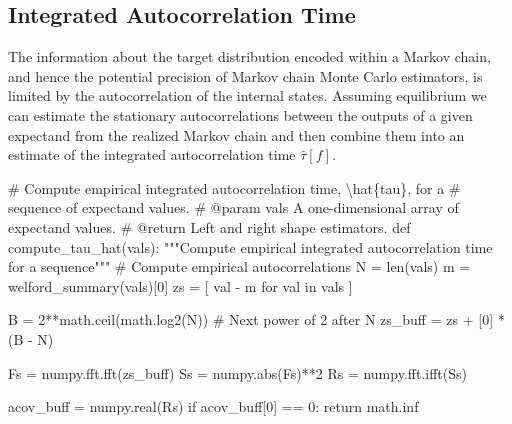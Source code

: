 \documentclass[
  letterpaper,
  DIV=11,
  numbers=noendperiod]{scrartcl}
\newenvironment{Shaded}{\begin{snugshade}}{\end{snugshade}}
\newcommand{\BuiltInTok}[1]{\textcolor[rgb]{0.00,0.23,0.31}{#1}}
\newcommand{\CommentTok}[1]{\textcolor[rgb]{0.37,0.37,0.37}{#1}}
\newcommand{\ControlFlowTok}[1]{\textcolor[rgb]{0.00,0.23,0.31}{#1}}
\newcommand{\DecValTok}[1]{\textcolor[rgb]{0.68,0.00,0.00}{#1}}
\newcommand{\KeywordTok}[1]{\textcolor[rgb]{0.00,0.23,0.31}{#1}}
\newcommand{\NormalTok}[1]{\textcolor[rgb]{0.00,0.23,0.31}{#1}}
\newcommand{\OperatorTok}[1]{\textcolor[rgb]{0.37,0.37,0.37}{#1}}
\begin{document}
\subsection{Integrated Autocorrelation
Time}\label{integrated-autocorrelation-time}

The information about the target distribution encoded within a Markov
chain, and hence the potential precision of Markov chain Monte Carlo
estimators, is limited by the autocorrelation of the internal states.
Assuming equilibrium we can estimate the stationary autocorrelations
between the outputs of a given expectand from the realized Markov chain
and then combine them into an estimate of the integrated autocorrelation
time \(\hat{\tau}[f]\).

\begin{Shaded}
\begin{Highlighting}[]
\CommentTok{\# Compute empirical integrated autocorrelation time, \textbackslash{}hat\{tau\}, for a}
\CommentTok{\# sequence of expectand values.}
\CommentTok{\# @param vals A one{-}dimensional array of expectand values.}
\CommentTok{\# @return Left and right shape estimators.}
\KeywordTok{def}\NormalTok{ compute\_tau\_hat(vals):}
  \CommentTok{"""Compute empirical integrated autocorrelation time for a sequence"""}
  \CommentTok{\# Compute empirical autocorrelations}
\NormalTok{  N }\OperatorTok{=} \BuiltInTok{len}\NormalTok{(vals)}
\NormalTok{  m }\OperatorTok{=}\NormalTok{ welford\_summary(vals)[}\DecValTok{0}\NormalTok{]}
\NormalTok{  zs }\OperatorTok{=}\NormalTok{ [ val }\OperatorTok{{-}}\NormalTok{ m }\ControlFlowTok{for}\NormalTok{ val }\KeywordTok{in}\NormalTok{ vals ]}
  
\NormalTok{  B }\OperatorTok{=} \DecValTok{2}\OperatorTok{**}\NormalTok{math.ceil(math.log2(N)) }\CommentTok{\# Next power of 2 after N}
\NormalTok{  zs\_buff }\OperatorTok{=}\NormalTok{ zs }\OperatorTok{+}\NormalTok{ [}\DecValTok{0}\NormalTok{] }\OperatorTok{*}\NormalTok{ (B }\OperatorTok{{-}}\NormalTok{ N)}
  
\NormalTok{  Fs }\OperatorTok{=}\NormalTok{ numpy.fft.fft(zs\_buff)}
\NormalTok{  Ss }\OperatorTok{=}\NormalTok{ numpy.}\BuiltInTok{abs}\NormalTok{(Fs)}\OperatorTok{**}\DecValTok{2}
\NormalTok{  Rs }\OperatorTok{=}\NormalTok{ numpy.fft.ifft(Ss)}

\NormalTok{  acov\_buff }\OperatorTok{=}\NormalTok{ numpy.real(Rs)}
  \ControlFlowTok{if}\NormalTok{ acov\_buff[}\DecValTok{0}\NormalTok{] }\OperatorTok{==} \DecValTok{0}\NormalTok{:}
    \ControlFlowTok{return}\NormalTok{ math.inf}


\end{Highlighting}
\end{Shaded}
\end{document}
